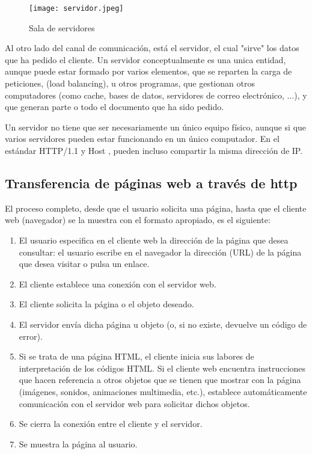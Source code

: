 \begin{wrapfigure}{l}{0.45\textwidth}
	\begin{center}
		\texttt{[image: servidor.jpeg]}
	\end{center}
	\caption{Sala de servidores}
	\label{wrap-fig:1}
\end{wrapfigure}

Al otro lado del canal de comunicación, está el servidor, el cual "sirve" los datos que ha pedido el cliente. Un servidor conceptualmente es una unica entidad, aunque puede estar formado por varios elementos, que se reparten la carga de peticiones, (load balancing), u otros programas, que gestionan otros computadores (como cache, bases de datos, servidores de correo electrónico, ...), y que generan parte o todo el documento que ha sido pedido. 

Un servidor no tiene que ser necesariamente un único equipo físico, aunque si que varios servidores pueden estar funcionando en un único computador. En el estándar HTTP/1.1 y Host , pueden incluso compartir la misma dirección de IP.

\subsection{Transferencia de páginas web a través de http}

El proceso completo, desde que el usuario solicita una página, hasta que el cliente
web (navegador) se la muestra con el formato apropiado, es el siguiente:

\begin{enumerate}
	\item El usuario especifica en el cliente web la dirección de la página que desea consultar: el usuario escribe en el navegador la dirección (URL) de la página que
	desea visitar o pulsa un enlace.
	\item El cliente establece una conexión con el servidor web.
	\item El cliente solicita la página o el objeto deseado. 
	\item El servidor envía dicha página u objeto (o, si no existe, devuelve un código de
	error).
	\item Si se trata de una página HTML, el cliente inicia sus labores de interpretación
	de los códigos HTML. Si el cliente web encuentra instrucciones que hacen referencia a otros objetos que se tienen que mostrar con la página (imágenes, sonidos, animaciones multimedia, etc.), establece automáticamente comunicación
	con el servidor web para solicitar dichos objetos.
	\item Se cierra la conexión entre el cliente y el servidor.
	\item Se muestra la página al usuario.
\end{enumerate}
	
